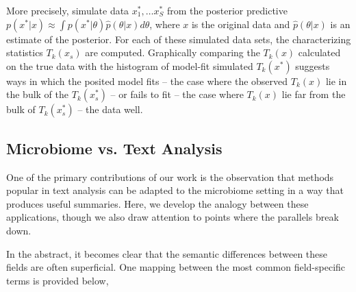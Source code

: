 \documentclass[oupdraft]{bio}
\begin{document}
More precisely, simulate data $x_{1}^{\ast}, \dots x_{S}^{\ast}$ from the
posterior predictive $p\left(x^{\ast}\vert x\right) \approx \int p\left(x^{\ast}
\vert \theta\right) \hat{p}\left(\theta \vert x \right)d\theta$, where $x$ is
the original data and $\hat{p}\left(\theta \vert x\right)$ is an estimate of the
posterior. For each of these simulated data sets, the characterizing statistics
$T_{k}\left(x_{s}\right)$ are computed. Graphically comparing the
$T_{k}\left(x\right)$ calculated on the true data with the histogram of
model-fit simulated $T_{k}\left(x^{\ast}\right)$ suggests ways in which the
posited model fits -- the case where the observed $T_{k}\left(x\right)$ lie in
the bulk of the $T_{k}\left(x^{\ast}_{s}\right)$ -- or fails to fit -- the case
where $T_{k}\left(x\right)$ lie far from the bulk of
$T_{k}\left(x^{\ast}_{s}\right)$ -- the data well.

\subsection{Microbiome vs. Text Analysis}

One of the primary contributions of our work is the observation that methods
popular in text analysis can be adapted to the microbiome setting in a way that
produces useful summaries. Here, we develop the analogy between these
applications, though we also draw attention to points where the parallels break
down.

In the abstract, it becomes clear that the semantic differences between these
fields are often superficial. One mapping between the most common field-specific
terms is provided below,
\end{document}
